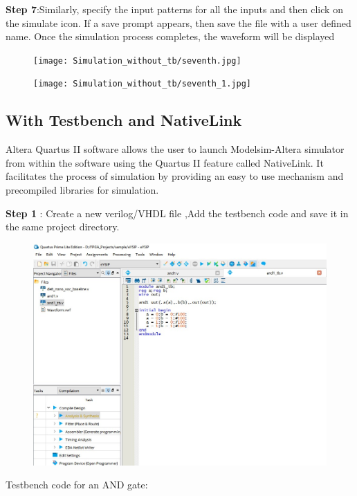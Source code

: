 \documentclass[12pt,singleside,a4paper]{article}
\begin{document}
\newpage
\noindent \textbf{Step 7}:Similarly, specify the input patterns for all the inputs and then click on the simulate \hspace*{37pt}icon. If a save prompt appears, then save the file with a user defined name. Once the \hspace*{37pt}simulation process completes, the waveform will be displayed
\begin{figure}[H]
\centering
\texttt{[image: Simulation\_without\_tb/seventh.jpg]}
\end{figure}
\begin{figure}[H]
\centering
\texttt{[image: Simulation\_without\_tb/seventh\_1.jpg]}
\end{figure}

\newpage




\subsection{With Testbench and NativeLink}
\par\hspace*{20pt} Altera Quartus II software allows the user to launch                       Modelsim-Altera simulator from within the software using the Quartus             II feature called NativeLink. It facilitates the process of                     simulation by providing an easy to use mechanism and precompiled                 libraries for simulation.

\vspace{4mm}\noindent \textbf{Step 1} : Create a new verilog/VHDL file ,Add the testbench code and save it in the same \hspace*{37pt}project directory.\newline

    \begin{figure}[H]
    \centering
    \includegraphics[scale=0.6,keepaspectratio]{nativelink/testbench1.jpg}
    \end{figure}
\noindent Testbench code for an AND gate:\newline
\end{document}
